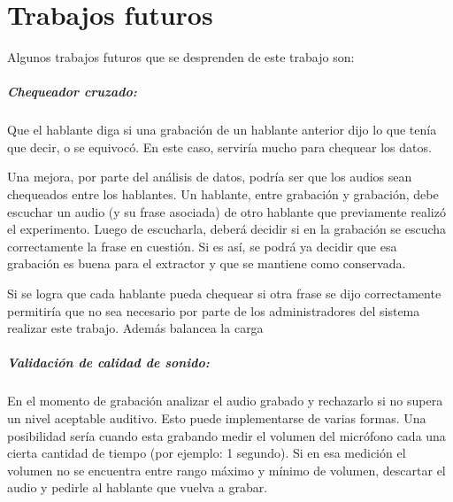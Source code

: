 \chapter{Trabajos futuros}

Algunos trabajos futuros que se desprenden de este trabajo son:



\paragraph*{Chequeador cruzado:} Que el hablante diga si una grabación de un hablante anterior dijo lo que tenía que decir, o se equivocó. En este caso, serviría mucho para chequear los datos. 

Una mejora, por parte del análisis de datos, podría ser que los audios sean chequeados entre los hablantes. Un hablante, entre grabación y grabación, debe escuchar un audio (y su frase asociada) de otro hablante que previamente realizó el experimento. Luego de escucharla, deberá decidir si en la grabación se escucha correctamente la frase en cuestión. Si es así, se podrá ya decidir que esa grabación es buena para el extractor y que se mantiene como conservada.

Si se logra que cada hablante pueda chequear si otra frase se dijo correctamente permitiría que no sea necesario por parte de los administradores del sistema realizar este trabajo. Además balancea la carga 

\paragraph*{Validación de calidad de sonido:} En el momento de grabación analizar el audio grabado y rechazarlo si no supera un nivel aceptable auditivo. Esto puede implementarse de varias formas. Una posibilidad sería cuando esta grabando medir el volumen del micrófono cada una cierta cantidad de tiempo (por ejemplo: 1 segundo). Si en esa medición el volumen no se encuentra entre rango máximo y mínimo de volumen, descartar el audio y pedirle al hablante que vuelva a grabar.

